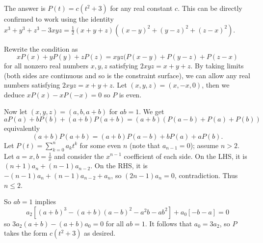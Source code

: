 The answer is $P(t)=c(t^2+3)$ for any real constant $c$. This can be directly confirmed to work using the identity $x^3+y^3+z^3-3xyz=\frac{1}{2}(x+y+z)((x-y)^2+(y-z)^2+(z-x)^2)$.

Rewrite the condition as \[xP(x)+yP(y)+zP(z)=xyz(P(x-y)+P(y-z)+P(z-x)\] for all nonzero real numbers $x,y,z$ satisfying $2xyz=x+y+z$. By taking limits (both sides are continuous and so is the constraint surface), we can allow any real numbers satisfying $2xyz=x+y+z$. Let $(x,y,z)=(x,-x,0)$, then we deduce $xP(x)-xP(-x)=0$ so $P$ is even.

Now let $(x,y,z)=(a,b,a+b)$ for $ab=1$. We get \[aP(a)+bP(b)+(a+b)P(a+b)=(a+b)(P(a-b)+P(a)+P(b))\] equivalently \[(a+b)P(a+b)=(a+b)P(a-b)+bP(a)+aP(b).\] Let $P(t)=\displaystyle\sum_{k=0}^na_kt^k$ for some even $n$ (note that $a_{n-1}=0$); assume $n>2$. Let $a=x,b=\frac{1}{x}$ and consider the $x^{n-1}$ coefficient of each side. On the LHS, it is $(n+1)a_n+(n-1)a_{n-2}$. On the RHS, it is $-(n-1)a_n+(n-1)a_{n-2}+a_n$, so $(2n-1)a_n=0$, contradiction. Thus $n\leq2$.

So $ab=1$ implies \[a_2[(a+b)^3-(a+b)(a-b)^2-a^2b-ab^2]+a_0[-b-a]=0\] so $3a_2(a+b)-(a+b)a_0=0$ for all $ab=1$. It follows that $a_0=3a_2$, so $P$ takes the form $c(t^2+3)$ as desired.